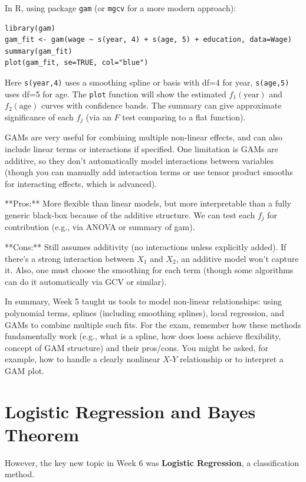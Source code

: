 \documentclass[11pt]{article}
\begin{document}
In R, using package \texttt{gam} (or \texttt{mgcv} for a more modern approach):
\begin{verbatim}
library(gam)
gam_fit <- gam(wage ~ s(year, 4) + s(age, 5) + education, data=Wage)
summary(gam_fit)
plot(gam_fit, se=TRUE, col="blue")
\end{verbatim}
Here \texttt{s(year,4)} uses a smoothing spline or basis with df=4 for year, \texttt{s(age,5)} uses df=5 for age. The \texttt{plot} function will show the estimated $f_1(\text{year})$ and $f_2(\text{age})$ curves with confidence bands. The summary can give approximate significance of each $f_j$ (via an $F$ test comparing to a flat function).

GAMs are very useful for combining multiple non-linear effects, and can also include linear terms or interactions if specified. One limitation is GAMs are additive, so they don't automatically model interactions between variables (though you can manually add interaction terms or use tensor product smooths for interacting effects, which is advanced).

**Pros:** More flexible than linear models, but more interpretable than a fully generic black-box because of the additive structure. We can test each $f_j$ for contribution (e.g., via ANOVA or summary of gam).

**Cons:** Still assumes additivity (no interactions unless explicitly added). If there's a strong interaction between $X_1$ and $X_2$, an additive model won't capture it. Also, one must choose the smoothing for each term (though some algorithms can do it automatically via GCV or similar).

In summary, Week 5 taught us tools to model non-linear relationships: using polynomial terms, splines (including smoothing splines), local regression, and GAMs to combine multiple such fits. For the exam, remember how these methods fundamentally work (e.g., what is a spline, how does loess achieve flexibility, concept of GAM structure) and their pros/cons. You might be asked, for example, how to handle a clearly nonlinear $X$-$Y$ relationship or to interpret a GAM plot.

\section{Logistic Regression and Bayes Theorem}

However, the key new topic in Week 6 was \textbf{Logistic Regression}, a classification method.
\end{document}
